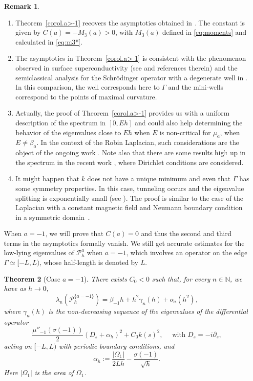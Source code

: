 \documentclass[10pt]{amsart}
\newcommand{\cP}{\mathcal{P}}
\theoremstyle{plain}
\newtheorem{theorem}{Theorem}[section]
\theoremstyle{definition}
\newtheorem{remark}[theorem]{Remark}
\newcommand{\N}{\mathbb{N}}
\providecommand{\skpt}{\par\smallskip\noindent}
\begin{document}
\skpt
\begin{remark}
\begin{enumerate}
\item Theorem~\ref{corol.a>-1} recovers the asymptotics obtained in \cite{AHK}.
The constant is given by $C(a)= -M_3(a)>0$, with $M_3(a)$ defined in \eqref{eq:moments} and calculated in \eqref{eq:m3*}.
\item The asymptotics in Theorem~\ref{corol.a>-1} is consistent with the phenomenon observed in surface superconductivity (see \cite{FH06} and references therein) and the semiclassical analysis for the Schrödinger operator with a degenerate well in \cite{HeSj5}. In this comparison, the well corresponds here to $\Gamma$ and the mini-wells correspond to the points of maximal curvature.
\item Actually, the proof of Theorem~\ref{corol.a>-1} provides us with a uniform description of the spectrum in $[0,Eh]$ and could also help determining the behavior of the eigenvalues close to $Eh$ when $E$ is non-critical for $\mu_a$, \ie when $E\neq \beta_a$. In the context of the Robin Laplacian, such considerations are the object of the ongoing work \cite{FLTRVN22}. Note also that there are some results
high up in the spectrum in the recent work \cite{GV}, where Dirichlet conditions are considered.
\item It might happen that $k$ does not have a unique minimum and even that $\Gamma$ has some symmetry properties. In this case, tunneling occurs and the eigenvalue splitting is exponentially small (see \cite{FHK22}). The proof is similar to the case of the Laplacian with a constant magnetic field and Neumann boundary condition in a symmetric domain~\cite{BHR22}.
\end{enumerate}
\end{remark}

When $a=-1$, we will prove that $C(a)=0$ and thus the second and third terms in the asymptotics formally vanish. We still get accurate estimates for the low-lying eigenvalues
of $\cP^a_h$ when $a=-1$, which involves an operator on the edge $\Gamma\simeq [-L,L)$, whose half-length is denoted by $L$.

\begin{theorem}[Case $a=-1$]\label{corol.a=-1} There exists $C_0<0$ such that, for every $n\in\N$, we have as $h\to0$,
\[
\lambda_n(\cP_h^{ \{a=-1\}})=
\beta_{-1} h+h^2\gamma_n(h)+o_n(h^2),
\]
where $\gamma_n(h)$ is the non-decreasing sequence of the eigenvalues of the differential operator
\[
\frac{\mu''_{-1}(\sigma(-1))}{2}\left(D_s+\alpha_h\right)^2+C_0k(s)^2,\quad\mbox{ with } D_s=-i\partial_s,
\] 
acting on $[-L,L)$ with periodic boundary conditions, and
\begin{equation}\label{defalphah}
\alpha_h:= \frac{|\Omega_1|}{2Lh} - \frac{\sigma(-1)}{\sqrt{h}}.
\end{equation}
Here $|\Omega_1|$ is the area of $\Omega_1$.
\end{theorem}
\end{document}
